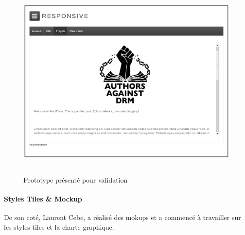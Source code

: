 \documentclass[11pt,a4paper]{report}
\begin{document}
				\begin{figure}[H]
					\centering
					\includegraphics[height=10cm]{Prototype.eps}
					\caption{Prototype présenté pour validation}
					\label{fig:Prototype}
				\end{figure}

			\paragraph*{Styles Tiles \& Mockup}De son coté, Laurent Cebe, a réalisé des mokups et a commencé à travailler sur les styles tiles et la charte graphique.
\end{document}
